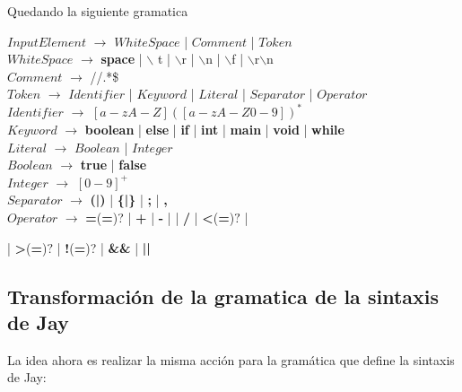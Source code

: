 Quedando la siguiente gramatica

\noindent$InputElement$ $\rightarrow$ $WhiteSpace$ | $Comment$ | $Token$ \\
$WhiteSpace$ $\rightarrow$ {\bf space} | $\backslash$ t | $\backslash$r | $\backslash$n | $\backslash$f | $\backslash$r$\backslash$n \\
$Comment$ $\rightarrow$ //.*\$ \\
$Token$ $\rightarrow$ $Identifier$ | $Keyword$ | $Literal$ | $Separator$ | $Operator$ \\
$Identifier$ $\rightarrow$ $[a-zA-Z]([a-zA-Z0-9])^{*}$ \\
$Keyword$ $\rightarrow$ {\bf boolean} | {\bf else} | {\bf if} | {\bf int} | {\bf main} | {\bf void} | {\bf while} \\
$Literal$ $\rightarrow$ $Boolean$ | $Integer$ \\ 
$Boolean$ $\rightarrow$ {\bf true} | {\bf false}\\
$Integer$ $\rightarrow$ $[0-9]^{+}$ \\
$Separator$ $\rightarrow$ {\bf (|)} | {\bf\{|\}} | {\bf;} | {\bf,}\\
$Operator$ $\rightarrow$ {\bf =}({\bf =})? | {\bf  +} | {\bf -} | {\bf *} | {\bf /} | {\bf <}({\bf =})$?$ |

\hspace{1.5cm}              | {\bf >}({\bf =})$?$ | {\bf !}({\bf =})? | {\bf \&\&} | {\bf ||}\\


\subsection{Transformación de la gramatica de la sintaxis de Jay}


La idea ahora es realizar la misma acción para la gramática que define la sintaxis de Jay:

